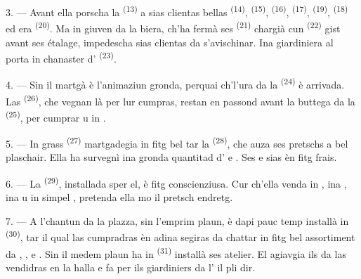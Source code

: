 3. --- Avant ella porscha la  \textsuperscript{(13)} a sias
clientas bellas  \textsuperscript{(14)}, 
\textsuperscript{(15)},  \textsuperscript{(16)}, 
\textsuperscript{(17)},  \textsuperscript{(19)}, 
\textsuperscript{(18)} ed era  \textsuperscript{(20)}. Ma in giuven da la biera,
ch'ha fermà ses  \textsuperscript{(21)} chargià cun  \textsuperscript{(22)} gist avant ses étalage, impedescha sias clientas da
s'avischinar. Ina giardiniera al porta in chanaster d'
\textsuperscript{(23)}.

\VUsaut{4.0mm}
\VUsaut{3.0mm}

4. --- Sin il martgà è l'animaziun gronda, perquai ch'l'ura da la  \textsuperscript{(24)} è arrivada. Las 
\textsuperscript{(26)}, che vegnan là per lur cumpras, restan en passond avant la buttega
da la  \textsuperscript{(25)}, per cumprar  u in
.

5. --- In grass  \textsuperscript{(27)} martgadegia in fitg bel
 tar la  \textsuperscript{(28)}, che auza ses pretschs a
bel plaschair. Ella ha survegnì ina gronda quantitad d' e . Ses  e sias  èn fitg frais.

\VUsaut{4.0mm}
\VUsaut{3.0mm}

6. --- La  \textsuperscript{(29)}, installada sper el, è fitg
conscienziusa. Cur ch'ella venda in , ina , ina
 u in simpel , pretenda ella mo il pretsch endretg.

7. --- A l'chantun da la plazza, sin l'emprim plaun, è dapi pauc temp installà in
 \textsuperscript{(30)}, tar il qual las cumpradras èn adina segiras
da chattar in fitg bel assortiment da , ,
 e . Sin il medem plaun ha in 
\textsuperscript{(31)} installà ses atelier. El agiavgia ils  da las
vendidras en la halla e fa per ils giardiniers  da l' il pli
dir.

